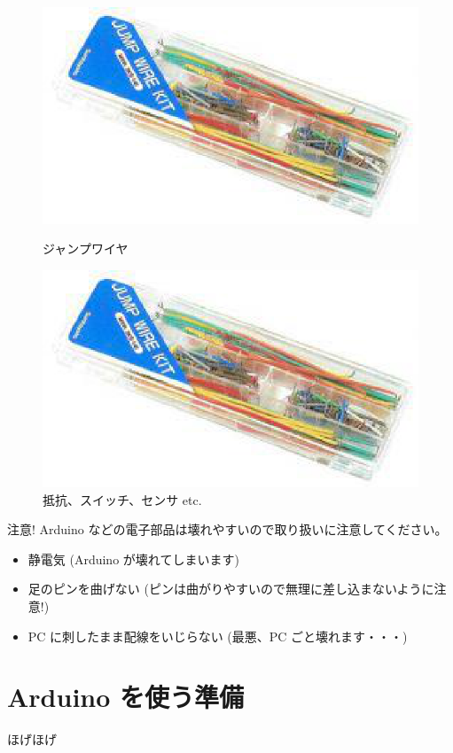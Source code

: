 \documentclass[11pt,a4paper]{jarticle}
\begin{document}
\begin{figure}[h!]
 \begin{minipage}{0.5\columnwidth}
  \centering
  \includegraphics[height=0.5\columnwidth]{img/jumpwire.eps}
  \caption{ジャンプワイヤ}
 \end{minipage}
 \begin{minipage}{0.5\columnwidth}
  \centering
  \includegraphics[height=0.5\columnwidth]{img/jumpwire.eps}
  \caption{抵抗、スイッチ、センサ etc.}
 \end{minipage}
\end{figure}


\begin{itembox}{注意!}
 Arduino などの電子部品は壊れやすいので取り扱いに注意してください。
 \begin{itemize}
  \item 静電気 (Arduino が壊れてしまいます)
  \item 足のピンを曲げない (ピンは曲がりやすいので無理に差し込まないように注意!)
  \item PC に刺したまま配線をいじらない (最悪、PC ごと壊れます・・・)
 \end{itemize}
\end{itembox}


\section{Arduino を使う準備}
ほげほげ
\end{document}
